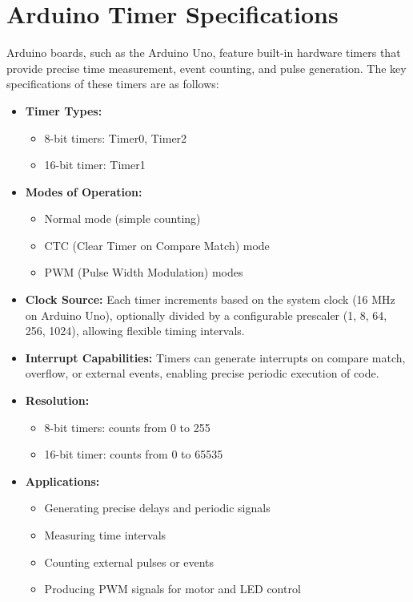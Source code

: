 \section{Arduino Timer Specifications}

Arduino boards, such as the Arduino Uno, feature built-in hardware timers that provide precise time measurement, event counting, and pulse generation. The key specifications of these timers are as follows:

\renewcommand{\labelitemi}{$\bullet$}
\renewcommand{\labelitemii}{$\bullet$}

\begin{itemize}
	\item \textbf{Timer Types:}
	\begin{itemize}
		\item 8-bit timers: Timer0, Timer2
		\item 16-bit timer: Timer1
	\end{itemize}
	
	\item \textbf{Modes of Operation:}
	\begin{itemize}
		\item Normal mode (simple counting)
		\item CTC (Clear Timer on Compare Match) mode
		\item PWM (Pulse Width Modulation) modes
	\end{itemize}
	
	\item \textbf{Clock Source:}  
	Each timer increments based on the system clock (16 MHz on Arduino Uno), optionally divided by a configurable prescaler (1, 8, 64, 256, 1024), allowing flexible timing intervals.
	
	\item \textbf{Interrupt Capabilities:}  
	Timers can generate interrupts on compare match, overflow, or external events, enabling precise periodic execution of code.
	
	\item \textbf{Resolution:}
	\begin{itemize}
		\item 8-bit timers: counts from 0 to 255
		\item 16-bit timer: counts from 0 to 65535
	\end{itemize}
	
	\item \textbf{Applications:}
	\begin{itemize}
		\item Generating precise delays and periodic signals
		\item Measuring time intervals
		\item Counting external pulses or events
		\item Producing PWM signals for motor and LED control
	\end{itemize}
\end{itemize}


